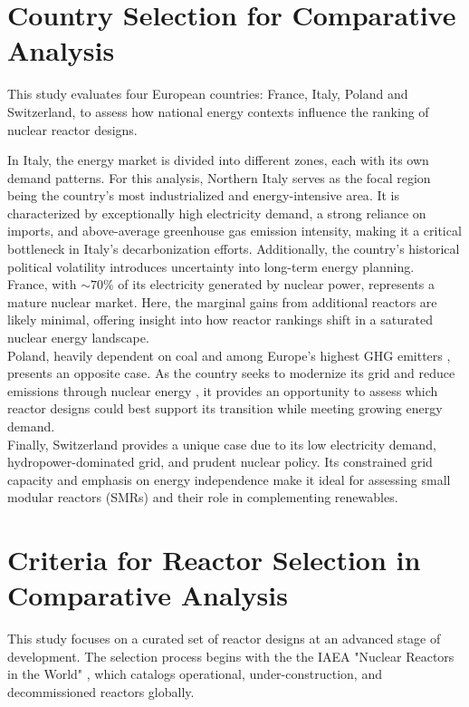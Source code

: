 \section{Country Selection for Comparative Analysis}
This study evaluates four European countries: France, Italy, Poland and Switzerland, to assess how national energy contexts influence the ranking of nuclear reactor designs.

In Italy, the energy market is divided into different zones, each with its own demand patterns. For this analysis, Northern Italy serves as the focal region being the country’s most industrialized and energy-intensive area\cite{PLACEHOLDER}. It is characterized by exceptionally high electricity demand, a strong reliance on imports, and above-average greenhouse gas emission intensity, making it a critical bottleneck in Italy’s decarbonization efforts. Additionally, the country’s historical political volatility introduces uncertainty into long-term energy planning. \\

France, with $\sim 70 \%$ of its electricity generated by nuclear power\cite{PLACEHOLDER}, represents a mature nuclear market. Here, the marginal gains from additional reactors are likely minimal, offering insight into how reactor rankings shift in a saturated nuclear energy landscape. \\

Poland, heavily dependent on coal and among Europe’s highest GHG emitters \cite{PLACEHOLDER}, presents an opposite case. As the country seeks to modernize its grid and reduce emissions through nuclear energy \cite{PLACEHOLDER}, it provides an opportunity to assess which reactor designs could best support its transition while meeting growing energy demand. \\

Finally, Switzerland provides a unique case due to its low electricity demand, hydropower-dominated grid, and prudent nuclear policy. Its constrained grid capacity and emphasis on energy independence make it ideal for assessing small modular reactors (SMRs) and their role in complementing renewables. \\

\section{Criteria for Reactor Selection in Comparative Analysis}
This study focuses on a curated set of reactor designs at an advanced stage of development.
The selection process begins with the the IAEA "Nuclear Reactors in the World" \cite{international2024iaea}, which catalogs operational, under-construction, and decommissioned reactors globally. \\

